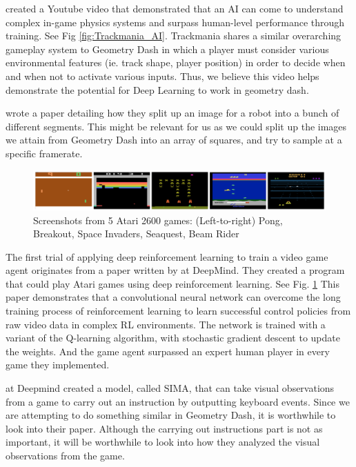 \documentclass{article} %
\begin{document}
\cite{Trackmania+AI} created a Youtube video that demonstrated that an AI 
can come to understand complex in-game physics systems and surpass
human-level performance through training. See Fig \ref{fig:Trackmania_AI}.
Trackmania shares a similar overarching gameplay system to Geometry Dash in 
which a player must 
consider various environmental features (ie. track shape, player 
position) in order to decide when and when not to activate various 
inputs. Thus, we believe this video helps demonstrate the potential 
for Deep Learning to work in geometry dash.

\cite{Robot+Object+Avoidance+Method} wrote a paper detailing how 
they split up an image for a robot into a bunch of different segments. 
This might be relevant for us as we could split up the images we attain
from Geometry Dash into an array of squares, and try to sample at a
specific framerate.

\begin{figure}[h]
\begin{center}
\includegraphics[width=1.0\textwidth]{Figs/Deepmind_atari.png}
\end{center}
\caption{Screenshots from 5 Atari 2600 games: 
(Left-to-right) Pong, Breakout, Space Invaders, Seaquest, Beam Rider
\citep{Trackmania+AI}}
\label{fig:Deep_mind_Atari_AI}
\end{figure}

The first trial of applying deep reinforcement learning to train a
video game agent originates from a paper written by
\cite{Playing+Atari+with+Deep+Reinforcement+Learning} at 
DeepMind. They created a program that could play Atari games using
deep reinforcement learning. See Fig. \ref{fig:Deep_mind_Atari_AI}
This paper demonstrates that a convolutional neural network can 
overcome the long training process of reinforcement learning to 
learn successful control policies from raw video data in complex 
RL environments. The network is trained with a variant of the 
Q-learning algorithm, with stochastic gradient descent to update 
the weights. And the game agent surpassed an expert human player 
in every game they implemented.

\cite{DeepMind+Sima} at Deepmind created a model, called SIMA, 
that can take visual observations from a game to carry out an 
instruction by outputting keyboard events. Since we are 
attempting to do something similar in Geometry Dash, it is 
worthwhile to look into their paper. Although the carrying 
out instructions part is not as important, it will be worthwhile
to look into how they analyzed the visual observations from the 
game.
\end{document}
